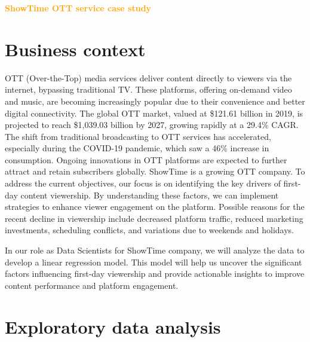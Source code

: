 \documentclass[12pt,a4paper]{style}
\begin{document}
	\tableofcontents
	\listoffigures
	\newpage
	\begin{center}
		\textcolor{orange}{\Large {\bf{ShowTime OTT service case study}}}
	\end{center}
	
\section{Business context}
OTT (Over-the-Top) media services deliver content directly to viewers via the internet, bypassing traditional TV. These platforms, offering on-demand video and music, are becoming increasingly popular due to their convenience and better digital connectivity. The global OTT market, valued at \$121.61 billion in 2019, is projected to reach \$1,039.03 billion by 2027, growing rapidly at a 29.4\% CAGR. The shift from traditional broadcasting to OTT services has accelerated, especially during the COVID-19 pandemic, which saw a 46\% increase in consumption. Ongoing innovations in OTT platforms are expected to further attract and retain subscribers globally.
ShowTime is a growing OTT company. To address the current objectives, our focus is on identifying the key drivers of first-day content viewership. By understanding these factors, we can implement strategies to enhance viewer engagement on the platform. Possible reasons for the recent decline in viewership include decreased platform traffic, reduced marketing investments, scheduling conflicts, and variations due to weekends and holidays.

In our role as Data Scientists for ShowTime company, we will analyze the data to develop a linear regression model. This model will help us uncover the significant factors influencing first-day viewership and provide actionable insights to improve content performance and platform engagement.
\section{Exploratory data analysis}
\end{document}

